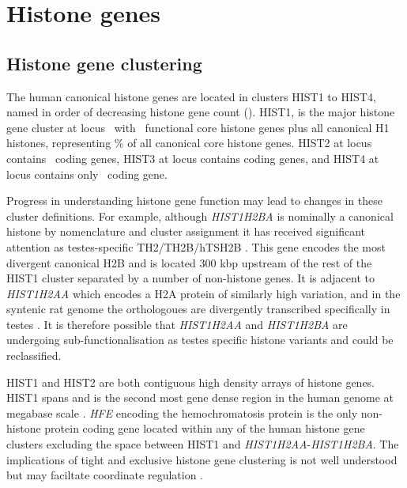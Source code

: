\section{Histone genes}

\subsection{Histone gene clustering}
	The human canonical histone genes are located in clusters HIST1 to HIST4, 
	named in order of decreasing histone gene count ().
	HIST1, is the major histone gene cluster at locus~\HISTOneLocus{}  
	with \CodingGenesInHISTOne{}~functional core histone genes plus all canonical H1 histones,
	representing \% of all canonical core histone genes. 
	HIST2 at locus~\HISTTwoLocus{} contains \CodingGenesInHISTTwo{}~coding genes, 
	HIST3 at locus \HISTThreeLocus{} contains \CodingGenesInHISTThree{} coding genes, 
	and HIST4 at locus \HISTFourLocus{} contains only \CodingGenesInHISTFour{}~coding gene. 

	Progress in understanding histone gene function may lead to changes in these cluster definitions. 
	For example, although \textit{HIST1H2BA} is nominally a canonical histone 
	by nomenclature and cluster assignment
	it has received significant attention as testes-specific TH2/TH2B/hTSH2B \citep{Zalensky2002,LiAusio2005,Shinagawa2014}.
	This gene encodes the most divergent canonical H2B 
	and is located 300 kbp upstream of the rest of the HIST1 cluster 
	separated by a number of non-histone genes. 
	It is adjacent to \textit{HIST1H2AA} which encodes a H2A protein of similarly high variation, 
	and in the syntenic rat genome the orthologoues are divergently transcribed specifically in testes \citep{HuhChae1991}. 
	It is therefore possible that \textit{HIST1H2AA} and \textit{HIST1H2BA} 
	are undergoing sub-functionalisation as testes specific histone variants and could be reclassified.

	HIST1 and HIST2 are both contiguous high density arrays of histone genes. 
	HIST1 spans \HISTOneSpan{} 
	and is the second most gene dense region in the human genome at megabase scale \citep{MHC-III-analysis}.
	\textit{HFE} encoding the hemochromatosis protein \citep{AlbigDoenecke1998} 
	is the only non-histone protein coding gene located within any of the human histone gene clusters
	excluding the space between HIST1 and \textit{HIST1H2AA}-\textit{HIST1H2BA}. 
	The implications of tight and exclusive histone gene clustering 
	is not well understood \citep{Eirinlopez2009} 
	but may faciltate coordinate regulation \citep{close-regulators}.


